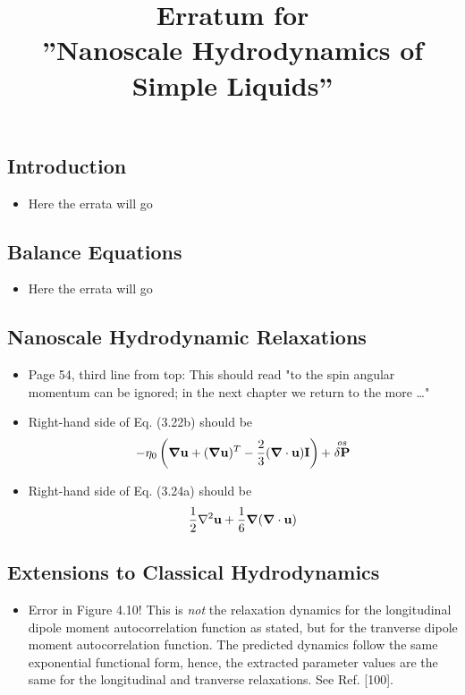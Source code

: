 \documentclass{article}
\title{Erratum for \\ ''Nanoscale Hydrodynamics of Simple Liquids''}
\date{}
\begin{document}
\maketitle

\subsection*{Introduction}
\begin{itemize}
\item Here the errata will go
\end{itemize}

\subsection*{Balance Equations}
\begin{itemize}
\item Here the errata will go
\end{itemize}

\subsection*{Nanoscale Hydrodynamic Relaxations}
	\begin{itemize}
		\item Page 54, third line from top: This should read "to the spin angular momentum can be ignored; 
			in the next chapter we return to the more \ldots"
		\item Right-hand side of Eq. (3.22b) should be
			\[
				-\eta_0 \left(
				\boldsymbol{\nabla}\bold{u} + (\boldsymbol{\nabla}\bold{u})^T - \frac{2}{3}
				(\boldsymbol{\nabla} \cdot \bold{u}) \bold{I} 
				\right) + \stackrel{os}{\delta \bold{P}}
			\]
		\item Right-hand side of Eq. (3.24a) should be
			\[
				\frac{1}{2} \nabla^2 \bold{u} + \frac{1}{6} \boldsymbol{\nabla}(\boldsymbol{\nabla} \cdot
				\bold{u})	
			\]
	\end{itemize}

\subsection*{Extensions to Classical Hydrodynamics}
\begin{itemize}
	\item Error in Figure 4.10! This is \emph{not} the relaxation dynamics for the longitudinal
		dipole moment autocorrelation function as stated, but for the 
		tranverse dipole moment autocorrelation function. The predicted dynamics 
		follow the same exponential functional form, hence, the extracted parameter 
		values are the same for the longitudinal and tranverse relaxations. See Ref. [100].
\end{itemize}
\end{document}
